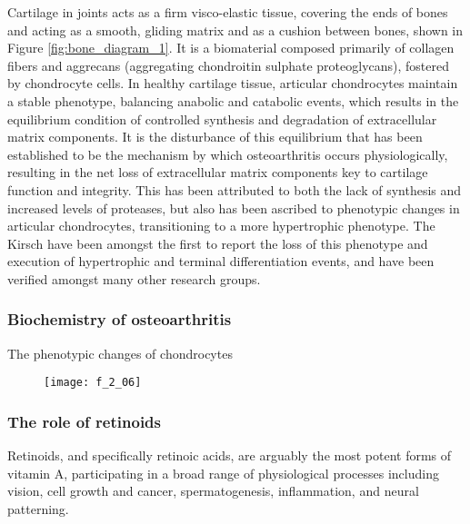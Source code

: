 \begin{refsection}
Cartilage in joints acts as a firm visco-elastic tissue, covering the ends of
bones and acting as a smooth, gliding matrix and as a cushion between bones,
shown in Figure \ref{fig:bone_diagram_1}. It is a biomaterial composed primarily
of collagen fibers and aggrecans (aggregating chondroitin sulphate
proteoglycans), fostered by chondrocyte cells. In healthy cartilage tissue,
articular chondrocytes maintain a stable phenotype, balancing anabolic and
catabolic events, which results in the equilibrium condition of controlled
synthesis and degradation of extracellular matrix components.\cite{Sandell2001}
It is the disturbance of this equilibrium that has been established to be the
mechanism by which osteoarthritis occurs physiologically, resulting in the net
loss of extracellular matrix components key to cartilage function and integrity.
This has been attributed to both the lack of synthesis and increased levels of
proteases, but also has been ascribed to phenotypic changes in articular
chondrocytes, transitioning to a more hypertrophic
phenotype.\cite{Goldring2000,VanderKraan2012} The Kirsch  have
been amongst the first to report the loss of this phenotype and execution of
hypertrophic and terminal differentiation events,\cite{Kirsch2000} and have been
verified amongst many other research
groups.\cite{Tchetina2007,Merz2003,Pfander2001,Davies2009} 

\subsubsection{Biochemistry of osteoarthritis}

The phenotypic changes of chondrocytes 
\begin{figure}[h!] \centering \texttt{[image: f\_2\_06]}
    \caption[]{\cite{Davies2009}}\label{fig:OA_phenotype} \end{figure}

\subsubsection{The role of retinoids}

Retinoids, and specifically retinoic acids, are arguably the most potent forms
of vitamin A, participating in a broad range of physiological processes
including vision,\cite{Hyatt1996} cell growth and cancer,\cite{Mongan2007}
spermatogenesis,\cite{Vernet2006} inflammation,\cite{Huang2007} and
neural patterning.\cite{Abu-Abed2001}


\end{refsection}
